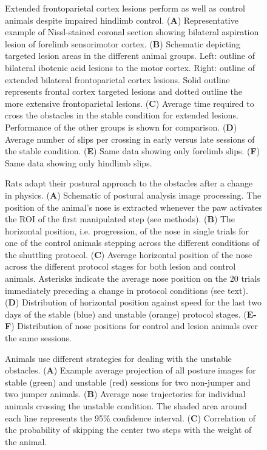 \begin{figure}
\centering

\caption{Extended frontoparietal cortex lesions perform as well as control animals despite impaired hindlimb control. (\textbf{A}) Representative example of Nissl-stained coronal section showing bilateral aspiration lesion of forelimb sensorimotor cortex. (\textbf{B}) Schematic depicting targeted lesion areas in the different animal groups. Left: outline of bilateral ibotenic acid lesions to the motor cortex. Right: outline of extended bilateral frontoparietal cortex lesions. Solid outline represents frontal cortex targeted lesions and dotted outline the more extensive frontoparietal lesions. (\textbf{C}) Average time required to cross the obstacles in the stable condition for extended lesions. Performance of the other groups is shown for comparison. (\textbf{D}) Average number of slips per crossing in early versus late sessions of the stable condition. (\textbf{E}) Same data showing only forelimb slips. (\textbf{F}) Same data showing only hindlimb slips.}
\label{fig:extended}
\end{figure}

\begin{figure}
\centering

\caption{Rats adapt their postural approach to the obstacles after a change in physics. (\textbf{A}) Schematic of postural analysis image processing. The position of the animal's nose is extracted whenever the paw activates the ROI of the first manipulated step (see methods). (\textbf{B}) The horizontal position, i.e. progression, of the nose in single trials for one of the control animals stepping across the different conditions of the shuttling protocol. (\textbf{C}) Average horizontal position of the nose across the different protocol stages for both lesion and control animals. Asterisks indicate the average nose position on the 20 trials immediately preceding a change in protocol conditions (see text). (\textbf{D}) Distribution of horizontal position against speed for the last two days of the stable (blue) and unstable (orange) protocol stages. (\textbf{E-F}) Distribution of nose positions for control and lesion animals over the same sessions.}
\label{fig:posture}
\end{figure}

\begin{figure}
\centering

\caption{Animals use different strategies for dealing with the unstable obstacles. (\textbf{A}) Example average projection of all posture images for stable (green) and unstable (red) sessions for two non-jumper and two jumper animals. (\textbf{B}) Average nose trajectories for individual animals crossing the unstable condition. The shaded area around each line represents the 95\% confidence interval. (\textbf{C}) Correlation of the probability of skipping the center two steps with the weight of the animal.}
\label{fig:jumping}
\end{figure}


